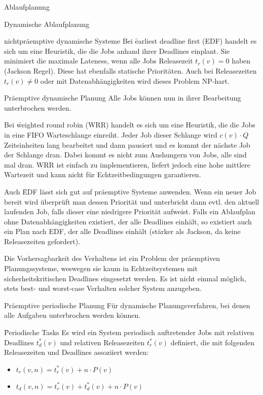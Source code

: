 \begin{chapter}{Ablaufplanung}
\begin{section}{Dynamische Ablaufplanung}
\begin{subsection}{nichtpräemptive dynamische Systeme}
   Bei \f{earliest deadline first (EDF)} handelt es sich um eine Heuristik, die die Jobs anhand ihrer Deadlines einplant. Sie minimiert die maximale Lateness, wenn alle Jobs Releasezeit $t_r(v)=0$ haben (Jackson Regel). Diese hat ebenfalls statische Prioritäten. Auch bei Releasezeiten $t_r(v) \neq 0$ oder mit Datenabhängigkeiten wird dieses Problem NP-hart.
  \end{subsection}
  
  \begin{subsection}{Präemptive dynamische Planung}
   Alle Jobs können nun in ihrer Bearbeitung unterbrochen werden. 
   
   Bei \f{weighted round robin (WRR)} handelt es sich um eine Heuristik, die die Jobs in eine FIFO Warteschlange einreiht. Jeder Job dieser Schlange wird $c(v)\cdot Q$ Zeiteinheiten lang bearbeitet und dann pausiert und es kommt der nächste Job der Schlange dran. Dabei kommt es nicht zum Aushungern von Jobs, alle sind mal dran. WRR ist einfach zu implementieren, liefert jedoch eine hohe mittlere Wartezeit und kann nicht für Echtzeitbedingungen garantieren.
   
   Auch \f{EDF} lässt sich gut auf präemptive Systeme anwenden. Wenn ein neuer Job bereit wird überprüft man dessen Priorität und unterbricht dann evtl. den aktuell laufenden Job, falls dieser eine niedrigere Priorität aufweist. Falls ein Ablaufplan ohne Datenabhängigkeiten existiert, der alle Deadlines einhält, so existiert auch ein Plan nach EDF, der alle Deadlines einhält (stärker als Jackson, da keine Releasezeiten gefordert).
   
   Die Vorhersagbarkeit des Verhaltens ist ein Problem der präemptiven Planungssysteme, weswegen sie kaum in Echtzeitsystemen mit sicherheitskritischen Deadlines eingesetzt werden. Es ist nicht einmal möglich, stets best- und worst-case Verhalten solcher System anzugeben.
  \end{subsection}
   
  \begin{subsection}{Präemptive periodische Planung}
   Für dynamische Planungsverfahren, bei denen alle Aufgaben unterbrochen werden können.
   
   \f{Periodische Tasks}
   Es wird ein System periodisch auftretender Jobs mit relativen Deadlines $t_d^*(v)$ und relativen Releasezeiten $t_r^*(v)$ definiert, die mit folgenden Releasezeiten und Deadlines assoziiert werden:
   \begin{itemize}
    \item $t_r(v,n) = t_r^*(v)+n\cdot P(v)$
    \item $t_d(v,n) = t_r^*(v)+t_d^*(v)+n\cdot P(v)$
   \end{itemize}
   

\end{subsection}
\end{section}
\end{chapter}
